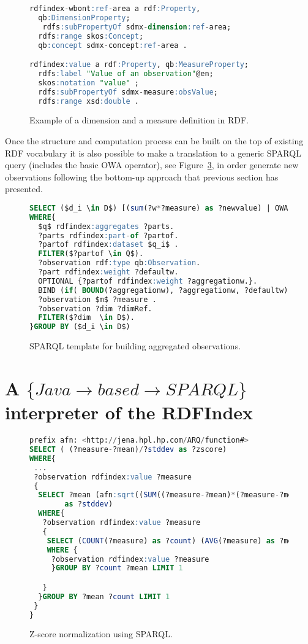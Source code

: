 \documentclass{llncs}
\begin{document}
\begin{figure}[!ht]
\begin{lstlisting}[language=SQL]  
rdfindex-wbont:ref-area a rdf:Property, 
  qb:DimensionProperty; 
   rdfs:subPropertyOf sdmx-dimension:ref-area; 
  rdfs:range skos:Concept; 
  qb:concept sdmx-concept:ref-area . 

rdfindex:value a rdf:Property, qb:MeasureProperty;
  rdfs:label "Value of an observation"@en;
  skos:notation "value" ;
  rdfs:subPropertyOf sdmx-measure:obsValue;
  rdfs:range xsd:double . 
\end{lstlisting}
\caption{Example of a dimension and a measure definition in RDF.}
 \label{fig:results-rdf-properties}
\end{figure}


Once the structure and computation process can be built on the top of existing RDF vocabulary it is also 
possible to make a translation to a generic SPARQL query (includes the basic OWA operator), see Figure~\ref{fig:results-rdf-sparql-template}, in order generate new observations following the bottom-up approach that previous section has presented.

\begin{figure}[!ht]
\begin{lstlisting}[language=SQL,mathescape]  
SELECT ($d_i \in D$) [(sum(?w*?measure) as ?newvalue) | OWA(?measure)]
WHERE{
  $q$ rdfindex:aggregates ?parts.
  ?parts rdfindex:part-of ?partof.
  ?partof rdfindex:dataset $q_i$ .
  FILTER($?partof \in Q$).  
  ?observation rdf:type qb:Observation.
  ?part rdfindex:weight ?defaultw.     
  OPTIONAL {?partof rdfindex:weight ?aggregationw.}.
  BIND (if( BOUND(?aggregationw), ?aggregationw, ?defaultw) AS ?w)
  ?observation $m$ ?measure . 
  ?observation ?dim ?dimRef. 
  FILTER($?dim  \in D$).
}GROUP BY ($d_i \in D$)
\end{lstlisting}
\caption{SPARQL template for building aggregated observations.}
 \label{fig:results-rdf-sparql-template}
\end{figure}


\section{A $\{Java\rightarrow based \rightarrow SPARQL\}$  interpreter of the RDFIndex}
%

\begin{figure}[!ht]
\begin{lstlisting}[language=SQL,mathescape]  
prefix afn: <http://jena.hpl.hp.com/ARQ/function#>
SELECT ( (?measure-?mean)/?stddev as ?zscore) 
WHERE{
 ...
 ?observation rdfindex:value ?measure 
 {
  SELECT ?mean (afn:sqrt((SUM((?measure-?mean)*(?measure-?mean))/?count)) 
		as ?stddev) 
  WHERE{ 
   ?observation rdfindex:value ?measure 
   {
    SELECT (COUNT(?measure) as ?count) (AVG(?measure) as ?mean)
    WHERE {
     ?observation rdfindex:value ?measure 
     }GROUP BY ?count ?mean LIMIT 1

   }	
  }GROUP BY ?mean ?count LIMIT 1
 }
}
\end{lstlisting}
\caption{Z-score normalization using SPARQL.}
 \label{fig:results-rdf-sparql-template}
\end{figure}
\end{document}
